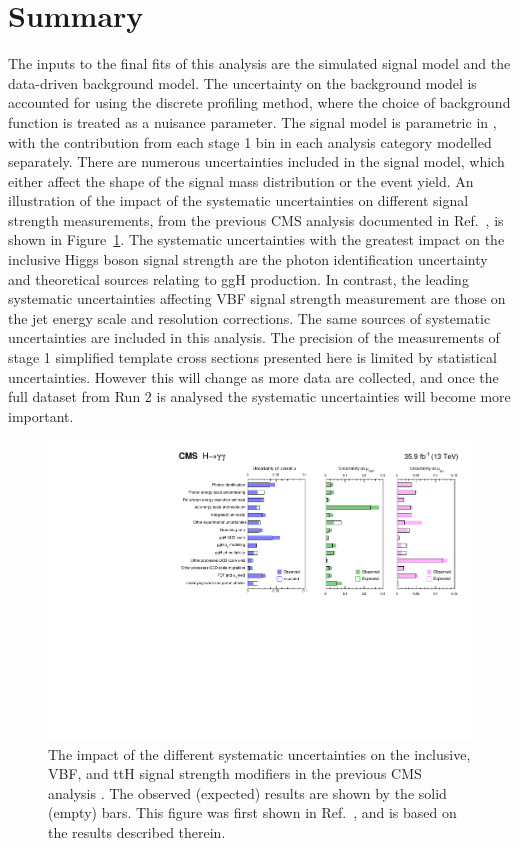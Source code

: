 \section{Summary}

The inputs to the final fits of this analysis are the simulated signal model 
and the data-driven background model.
The uncertainty on the background model is accounted for using the discrete profiling method, 
where the choice of background function is treated as a nuisance parameter.
The signal model is parametric in \mH, 
with the contribution from each stage 1 bin in each analysis category modelled separately.
There are numerous uncertainties included in the signal model, 
which either affect the shape of the signal mass distribution 
or the event yield.
An illustration of the impact of the systematic uncertainties 
on different signal strength measurements, 
from the previous CMS \Hgg analysis documented in Ref.~\cite{HIG-16-040}, 
is shown in Figure~\ref{fig:sigbkg_systematics}.
The systematic uncertainties with the greatest impact on the inclusive Higgs boson signal strength
are the photon identification uncertainty and theoretical sources relating to ggH production.
In contrast, the leading systematic uncertainties affecting VBF signal strength measurement 
are those on the jet energy scale and resolution corrections.
The same sources of systematic uncertainties are included in this analysis.
The precision of the measurements of stage 1 simplified template cross sections presented here
is limited by statistical uncertainties.
However this will change as more data are collected, 
and once the full dataset from Run 2 is analysed 
the systematic uncertainties will become more important.

\begin{figure}[hptb]
  \centering
  \includegraphics[width=\textwidth]{Figures/SigBkg/SystematicsTable.pdf}
  \caption[The impact of systematic uncertainties on signal strength measurements from Ref.~\cite{HIG-16-040}.]
  {
    The impact of the different systematic uncertainties on the inclusive, VBF, and ttH 
    signal strength modifiers in the previous CMS \Hgg analysis \cite{HIG-16-040}.
    The observed (expected) results are shown by the solid (empty) bars.
    This figure was first shown in Ref.~\cite{HIG-16-040}, 
    and is based on the results described therein.
  }
  \label{fig:sigbkg_systematics}
\end{figure}
